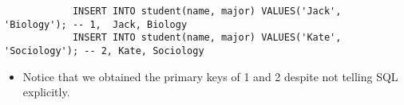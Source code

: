 \begin{itemize}
\begin{verbatim}
            INSERT INTO student(name, major) VALUES('Jack', 'Biology'); -- 1,  Jack, Biology
            INSERT INTO student(name, major) VALUES('Kate', 'Sociology'); -- 2, Kate, Sociology
        \end{verbatim}
        \begin{itemize}
            \item Notice that we obtained the primary keys of 1 and 2 despite not telling SQL explicitly.
        \end{itemize}
\end{itemize}
